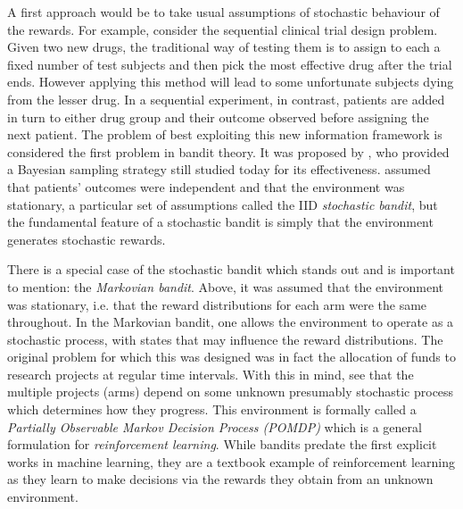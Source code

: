 \par A first approach would be to take usual assumptions of stochastic behaviour of the rewards. For example, consider the sequential clinical trial design problem. Given two new drugs, the traditional way of testing them is to assign to each a fixed number of test subjects and then pick the most effective drug after the trial ends. However applying this method will lead to some unfortunate subjects dying from the lesser drug. In a sequential experiment, in contrast, patients are added in turn to either drug group and their outcome observed before assigning the next patient. The problem of best exploiting this new information framework is considered the first problem in bandit theory. It was proposed by \citet{thompson:1933}, who provided a Bayesian sampling strategy still studied today for its effectiveness\cite{agrawal:2012}. \citeauthor{thompson:1933} assumed that patients' outcomes were independent and that the environment was stationary, a particular set of assumptions called the IID {\em stochastic bandit}\cite{robbins:1952}, but the fundamental feature of a stochastic bandit is simply that the environment generates stochastic rewards. 

\par There is a special case of the stochastic bandit which stands out and is important to mention: the {\em Markovian bandit}. Above, it was assumed that the environment was stationary, i.e. that the reward distributions for each arm were the same throughout. In the Markovian bandit, one allows the environment to operate as a stochastic process, with states that may influence the reward distributions. The original problem for which this was designed was in fact the allocation of funds to research projects\cite{gittins:1989} at regular time intervals. With this in mind, see that the multiple projects (arms) depend on some unknown presumably stochastic process which determines how they progress. This environment is formally called a {\em Partially Observable Markov Decision Process (POMDP)} which is a general formulation\cite{sutton:1998} for {\em reinforcement learning}. While bandits predate the first explicit works in machine learning\cite{rosenblatt:1958,samuel:1959}, they are a textbook example of reinforcement learning as they learn to make decisions via the rewards they obtain from an unknown environment.


